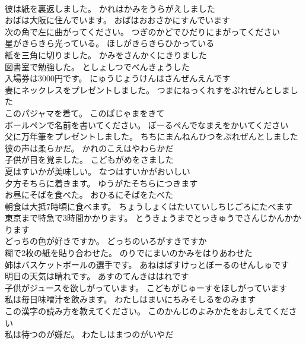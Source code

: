 \documentclass[8pt]{extreport}
\begin{document}
\begin{CJK}{UTF8}{min}
\\	彼は紙を裏返しました。	かれはかみをうらがえしました 
\\	おばは大阪に住んでいます。	おばはおおさかにすんでいます 
\\	次の角で左に曲がってください。	つぎのかどでひだりにまがってください 
\\	星がきらきら光っている。	ほしがきらきらひかっている 
\\	紙を三角に切りました。	かみをさんかくにきりました 
\\	図書室で勉強した。	としょしつでべんきょうした 
\\	入場券は3000円です。	にゅうじょうけんはさんぜんえんです 
\\	妻にネックレスをプレゼントしました。	つまにねっくれすをぷれぜんとしました 
\\	このパジャマを着て。	このぱじゃまをきて 
\\	ボールペンで名前を書いてください。	ぼーるぺんでなまえをかいてください 
\\	父に万年筆をプレゼントしました。	ちちにまんねんひつをぷれぜんとしました 
\\	彼の声は柔らかだ。	かれのこえはやわらかだ 
\\	子供が目を覚ました。	こどもがめをさました 
\\	夏はすいかが美味しい。	なつはすいかがおいしい 
\\	夕方そちらに着きます。	ゆうがたそちらにつきます 
\\	お昼にそばを食べた。	おひるにそばをたべた 
\\	朝食は大抵7時頃に食べます。	ちょうしょくはたいていしちじごろにたべます 
\\	東京まで特急で3時間かかります。	とうきょうまでとっきゅうでさんじかんかかります 
\\	どっちの色が好きですか。	どっちのいろがすきですか 
\\	糊で2枚の紙を貼り合わせた。	のりでにまいのかみをはりあわせた 
\\	姉はバスケットボールの選手です。	あねはばすけっとぼーるのせんしゅです 
\\	明日の天気は晴れです。	あすのてんきははれです 
\\	子供がジュースを欲しがっています。	こどもがじゅーすをほしがっています 
\\	私は毎日味噌汁を飲みます。	わたしはまいにちみそしるをのみます 
\\	この漢字の読み方を教えてください。	このかんじのよみかたをおしえてください 
\\	私は待つのが嫌だ。	わたしはまつのがいやだ 

\end{CJK}
\end{document}
